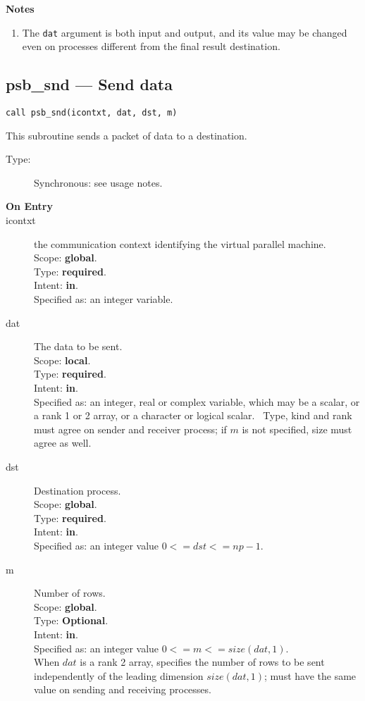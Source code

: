 {\par\noindent\large\bfseries Notes}
\begin{enumerate}
\item The \verb|dat| argument is both input and output, and its
  value may be changed even on processes different from the final
  result destination.
\end{enumerate}


\clearpage\subsection*{psb\_snd --- Send data}

\begin{verbatim}
call psb_snd(icontxt, dat, dst, m)
\end{verbatim}

This subroutine sends a packet of data to a destination.
\begin{description}
\item[Type:] Synchronous: see usage notes. 
\item[\bf  On Entry ]
\item[icontxt] the communication context identifying the virtual
  parallel machine.\\
Scope: {\bf global}.\\
Type: {\bf required}.\\
Intent: {\bf in}.\\
Specified as: an integer variable.
\item[dat] The data to be sent.\\
Scope: {\bf local}.\\
Type: {\bf required}.\\
Intent: {\bf in}.\\
Specified as: an integer, real or complex variable, which may be a
scalar, or a rank 1 or 2 array, or a character or logical scalar. \
Type, kind and  rank must agree on sender and receiver process; if $m$ is
not specified, size must agree as well. 
\item[dst] Destination process.\\
Scope: {\bf global}.\\
Type: {\bf required}.\\
Intent: {\bf in}.\\
Specified as: an integer value $0<= dst <= np-1$. \\
\item[m] Number of rows.\\
Scope: {\bf global}.\\
Type: {\bf Optional}.\\
Intent: {\bf in}.\\
Specified as: an integer value $0<= m <= size(dat,1)$. \\
When $dat$ is a rank 2 array, specifies the number of rows to be sent
independently of the leading dimension $size(dat,1)$; must have the
same value on sending and receiving processes.
\end{description}


